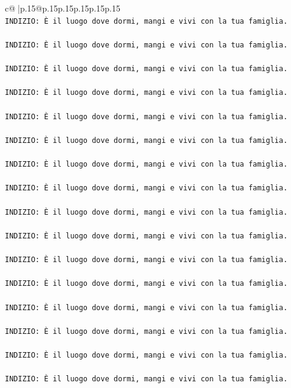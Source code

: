 \documentclass{article}
\begin{document}
{\begin{supertabular}{c@{$\;$}|p{.15\linewidth}@{}p{.15\linewidth}p{.15\linewidth}p{.15\linewidth}p{.15\linewidth}p{.15\linewidth}}
{{{\\ 
\texttt{INDIZIO: È il luogo dove dormi, mangi e vivi con la tua famiglia.} \\
\\ 
\texttt{INDIZIO: È il luogo dove dormi, mangi e vivi con la tua famiglia.} \\
\\ 
\texttt{INDIZIO: È il luogo dove dormi, mangi e vivi con la tua famiglia.} \\
\\ 
\texttt{INDIZIO: È il luogo dove dormi, mangi e vivi con la tua famiglia.} \\
\\ 
\texttt{INDIZIO: È il luogo dove dormi, mangi e vivi con la tua famiglia.} \\
\\ 
\texttt{INDIZIO: È il luogo dove dormi, mangi e vivi con la tua famiglia.} \\
\\ 
\texttt{INDIZIO: È il luogo dove dormi, mangi e vivi con la tua famiglia.} \\
\\ 
\texttt{INDIZIO: È il luogo dove dormi, mangi e vivi con la tua famiglia.} \\
\\ 
\texttt{INDIZIO: È il luogo dove dormi, mangi e vivi con la tua famiglia.} \\
\\ 
\texttt{INDIZIO: È il luogo dove dormi, mangi e vivi con la tua famiglia.} \\
\\ 
\texttt{INDIZIO: È il luogo dove dormi, mangi e vivi con la tua famiglia.} \\
\\ 
\texttt{INDIZIO: È il luogo dove dormi, mangi e vivi con la tua famiglia.} \\
\\ 
\texttt{INDIZIO: È il luogo dove dormi, mangi e vivi con la tua famiglia.} \\
\\ 
\texttt{INDIZIO: È il luogo dove dormi, mangi e vivi con la tua famiglia.} \\
\\ 
\texttt{INDIZIO: È il luogo dove dormi, mangi e vivi con la tua famiglia.} \\
\\ 
\texttt{INDIZIO: È il luogo dove dormi, mangi e vivi con la tua famiglia.} \\
\\ 
}}}
\end{supertabular}}
\end{document}
